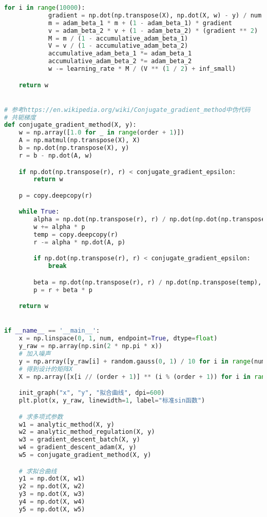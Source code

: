 \documentclass[withoutpreface,bwprint]{cumcmthesis}
\begin{document}
\begin{appendix}
\begin{lstlisting}[language=python]
        for i in range(10000):
            gradient = np.dot(np.transpose(X), np.dot(X, w) - y) / num
            m = adam_beta_1 * m + (1 - adam_beta_1) * gradient
            v = adam_beta_2 * v + (1 - adam_beta_2) * (gradient ** 2)
            M = m / (1 - accumulative_adam_beta_1)
            V = v / (1 - accumulative_adam_beta_2)
            accumulative_adam_beta_1 *= adam_beta_1
            accumulative_adam_beta_2 *= adam_beta_2
            w -= learning_rate * M / (V ** (1 / 2) + inf_small)

    return w


# 参考https://en.wikipedia.org/wiki/Conjugate_gradient_method中伪代码
# 共轭梯度
def conjugate_gradient_method(X, y):
    w = np.array([1.0 for _ in range(order + 1)])
    A = np.matmul(np.transpose(X), X)
    b = np.dot(np.transpose(X), y)
    r = b - np.dot(A, w)

    if np.dot(np.transpose(r), r) < conjugate_gradient_epsilon:
        return w

    p = copy.deepcopy(r)

    while True:
        alpha = np.dot(np.transpose(r), r) / np.dot(np.dot(np.transpose(p), A), p)
        w += alpha * p
        temp = copy.deepcopy(r)
        r -= alpha * np.dot(A, p)

        if np.dot(np.transpose(r), r) < conjugate_gradient_epsilon:
            break

        beta = np.dot(np.transpose(r), r) / np.dot(np.transpose(temp), temp)
        p = r + beta * p

    return w


if __name__ == '__main__':
    x = np.linspace(0, 1, num, endpoint=True, dtype=float)
    y_raw = np.array(np.sin(2 * np.pi * x))
    # 加入噪声
    y = np.array([y_raw[i] + random.gauss(0, 1) / 10 for i in range(num)])
    # 得到设计的矩阵X
    X = np.array([x[i // (order + 1)] ** (i % (order + 1)) for i in range(num * (order + 1))]).reshape(num, order + 1)

    init_graph("x", "y", "拟合曲线", dpi=600)
    plt.plot(x, y_raw, linewidth=1, label="标准sin函数")

    # 求多项式参数
    w1 = analytic_method(X, y)
    w2 = analytic_method_regulation(X, y)
    w3 = gradient_descent_batch(X, y)
    w4 = gradient_descent_adam(X, y)
    w5 = conjugate_gradient_method(X, y)

    # 求拟合曲线
    y1 = np.dot(X, w1)
    y2 = np.dot(X, w2)
    y3 = np.dot(X, w3)
    y4 = np.dot(X, w4)
    y5 = np.dot(X, w5)


\end{lstlisting}
\end{appendix}
\end{document}
